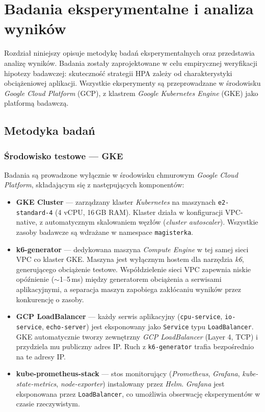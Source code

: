 \chapter{Badania eksperymentalne i analiza wyników}

Rozdział niniejszy opisuje metodykę badań eksperymentalnych oraz przedstawia analizę wyników. Badania zostały zaprojektowane w celu empirycznej weryfikacji hipotezy badawczej: skuteczność strategii HPA zależy od charakterystyki obciążeniowej aplikacji. Wszystkie eksperymenty są przeprowadzane w środowisku \textit{Google Cloud Platform} (GCP), z klastrem \textit{Google Kubernetes Engine} (GKE) jako platformą badawczą.

\section{Metodyka badań}

\subsection{Środowisko testowe — GKE}

Badania są prowadzone wyłącznie w środowisku chmurowym \textit{Google Cloud Platform}, składającym się z następujących komponentów:

\begin{itemize}
  \item \textbf{GKE Cluster} — zarządzany klaster \textit{Kubernetes} na maszynach \texttt{e2-standard-4} (4 vCPU, 16\,GB RAM). Klaster działa w konfiguracji VPC-native, z automatycznym skalowaniem węzłów (\textit{cluster autoscaler}). Wszystkie zasoby badawcze są wdrażane w namespace \texttt{magisterka}.

  \item \textbf{k6-generator} — dedykowana maszyna \textit{Compute Engine} w tej samej sieci VPC co klaster GKE. Maszyna jest wyłącznym hostem dla narzędzia \textit{k6}, generującego obciążenie testowe. Współdzielenie sieci VPC zapewnia niskie opóźnienie ($\sim$1--5\,ms) między generatorem obciążenia a serwisami aplikacyjnymi, a separacja maszyn zapobiega zakłócaniu wyników przez konkurencję o zasoby.

  \item \textbf{GCP LoadBalancer} — każdy serwis aplikacyjny (\texttt{cpu-service}, \texttt{io-service}, \texttt{echo-server}) jest eksponowany jako \texttt{Service} typu \texttt{LoadBalancer}. GKE automatycznie tworzy zewnętrzny \textit{GCP LoadBalancer} (Layer 4, TCP) i przydziela mu publiczny adres IP. Ruch z \texttt{k6-generator} trafia bezpośrednio na te adresy IP.

  \item \textbf{kube-prometheus-stack} — stos monitorujący (\textit{Prometheus}, \textit{Grafana}, \textit{kube-state-metrics}, \textit{node-exporter}) instalowany przez \textit{Helm}. \textit{Grafana} jest eksponowana przez \texttt{LoadBalancer}, co umożliwia obserwację eksperymentów w czasie rzeczywistym.
\end{itemize}

